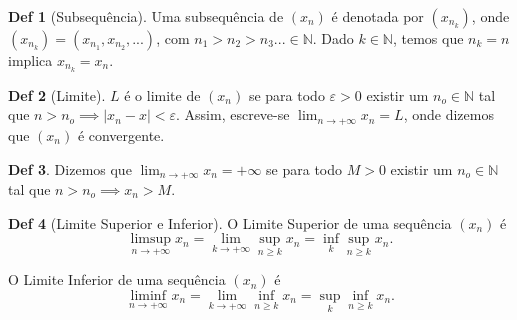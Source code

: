 \documentclass[journal, letterpaper]{IEEEtran}
\theoremstyle{definition}
\newtheorem{definition}{Def}[section]
\begin{document}
\begin{definition}[Subsequência]
	Uma subsequência de $(x_n)$ é denotada por $(x_{n_k})$, onde
	$(x_{n_k}) = (x_{n_1},x_{n_2},...)$, com $n_1 > n_2 > n_3 ... \in \mathbb N$.
	Dado $k \in \mathbb N$, temos que $n_k = n$ implica $x_{n_k} = x_n$.
\end{definition}

\begin{definition}[Limite]
	$L$ é o limite de $(x_n)$ se para todo $\varepsilon > 0$ existir um
	$n_o \in \mathbb N$ tal que $n>n_o \implies |x_n - x| < \varepsilon$.
	Assim, escreve-se $\lim_{n\to +\infty} x_n = L$, onde dizemos que
	$(x_n)$ é convergente.
\end{definition}

\begin{definition}
	Dizemos que $\lim_{n \to +\infty} x_n = +\infty$ se
	para todo $M > 0$ existir um $n_o \in \mathbb N$ tal que
	$n > n_o \implies x_n > M$.
\end{definition}

\begin{definition}[Limite Superior e Inferior]
	O Limite Superior de uma sequência $(x_n)$ é
	\begin{equation}
	\limsup_{n\to +\infty} x_n= \lim_{k\to +\infty} \sup_{n\geq k} x_n = \inf_k \sup_{n \geq k} x_n.
	\end{equation}

	O Limite Inferior de uma sequência $(x_n)$ é
	\begin{equation}
	\liminf_{n\to +\infty} x_n= \lim_{k\to +\infty} \inf_{n\geq k} x_n = \sup_k \inf_{n \geq k} x_n.
	\end{equation}
\end{definition}
\end{document}
